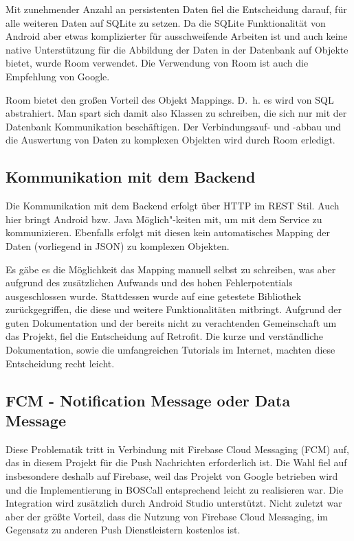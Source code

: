 Mit zunehmender Anzahl an persistenten Daten fiel die Entscheidung darauf, für alle weiteren Daten auf SQLite zu setzen. Da die SQLite Funktionalität von Android aber etwas komplizierter für ausschweifende Arbeiten ist und auch keine native Unterstützung für die Abbildung der Daten in der Datenbank auf Objekte bietet, wurde Room verwendet. Die Verwendung von Room ist auch die Empfehlung von Google.\cite{Android:DBDocumentation}

Room bietet den großen Vorteil des Objekt Mappings. D.~h. es wird von SQL abstrahiert. Man spart sich damit also Klassen zu schreiben, die sich nur mit der Datenbank Kommunikation beschäftigen. Der Verbindungsauf- und -abbau und die Auswertung von Daten zu komplexen Objekten wird durch Room erledigt.

\subsection{Kommunikation mit dem Backend}
Die Kommunikation mit dem Backend erfolgt über HTTP im REST Stil. Auch hier bringt Android bzw. Java Möglich"-keiten mit, um mit dem Service zu kommunizieren. Ebenfalls erfolgt mit diesen kein automatisches Mapping der Daten (vorliegend in JSON) zu komplexen Objekten.

Es gäbe es die Möglichkeit das Mapping manuell selbst zu schreiben, was aber aufgrund des zusätzlichen Aufwands und des hohen Fehlerpotentials ausgeschlossen wurde. Stattdessen wurde auf eine getestete Bibliothek zurückgegriffen, die diese und weitere Funktionalitäten mitbringt. Aufgrund der guten Dokumentation und der bereits nicht zu verachtenden Gemeinschaft um das Projekt, fiel die Entscheidung auf Retrofit.\cite{Github:Retrofit} Die kurze und verständliche Dokumentation, sowie die umfangreichen Tutorials im Internet, machten diese Entscheidung recht leicht.

\subsection{FCM - Notification Message oder Data Message}
Diese Problematik tritt in Verbindung mit Firebase Cloud Messaging (FCM) auf, das in diesem Projekt für die Push Nachrichten erforderlich ist. Die Wahl fiel auf insbesondere deshalb auf Firebase, weil das Projekt von Google betrieben wird und die Implementierung in BOSCall entsprechend leicht zu realisieren war. Die Integration wird zusätzlich durch Android Studio unterstützt. Nicht zuletzt war aber der größte Vorteil, dass die Nutzung von Firebase Cloud Messaging, im Gegensatz zu anderen Push Dienstleistern kostenlos ist.

